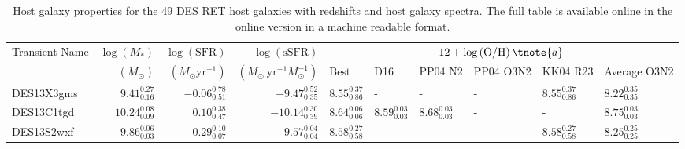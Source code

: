 \documentclass[fleqn,usenatbib,]{mnras}
\begin{document}
\begin{table}

\caption{Host galaxy properties for the 49 DES RET host galaxies with redshifts and host galaxy spectra. The full table is available online in the online version in a machine readable format.}
\begin{threeparttable}
\begin{tabular}{lrrrllllll}
\toprule
Transient Name &$\log \left(M_*\right)$ &$\log \left(\mathrm{SFR}\right)$ &  $\log \left(\mathrm{sSFR}\right)$ &                                                           \multicolumn{6}{c}{$12+\log\left(\mathrm{O/H}\right)\tnote{a} $}\\
{} & $\left( M_{\odot}\right)$ & $\left(M_{\odot} \mathrm{yr}^{-1}\right)$&$\left(M_{\odot}\ \mathrm{yr}^{-1} M_{\odot}^{-1}\right)$& Best &                                                           D16 &                                                       PP04 N2 &                                                     PP04 O3N2 &                                                      KK04 R23 &                                                   Average O3N2\tnote{b}\\
\midrule
DES13X3gms &   $9.41 _{\scriptscriptstyle 0.16} ^{\scriptscriptstyle 0.27}$ &  $-0.06 _{\scriptscriptstyle 0.51} ^{\scriptscriptstyle 0.78}$ &   $-9.47 _{\scriptscriptstyle 0.35} ^{\scriptscriptstyle 0.52}$ &  $8.55 _{\scriptscriptstyle 0.86} ^{\scriptscriptstyle 0.37}$ &                                                             - &                                                             - &                                                             - &  $8.55 _{\scriptscriptstyle 0.86} ^{\scriptscriptstyle 0.37}$ &   $8.22 _{\scriptscriptstyle 0.35} ^{\scriptscriptstyle 0.35}$ \\
DES13C1tgd &  $10.24 _{\scriptscriptstyle 0.09} ^{\scriptscriptstyle 0.08}$ &   $0.10 _{\scriptscriptstyle 0.47} ^{\scriptscriptstyle 0.38}$ &  $-10.14 _{\scriptscriptstyle 0.39} ^{\scriptscriptstyle 0.30}$ &  $8.64 _{\scriptscriptstyle 0.06} ^{\scriptscriptstyle 0.06}$ &  $8.59 _{\scriptscriptstyle 0.03} ^{\scriptscriptstyle 0.03}$ &  $8.68 _{\scriptscriptstyle 0.03} ^{\scriptscriptstyle 0.03}$ &                                                             - &                                                             - &   $8.75 _{\scriptscriptstyle 0.03} ^{\scriptscriptstyle 0.03}$ \\
DES13S2wxf &   $9.86 _{\scriptscriptstyle 0.03} ^{\scriptscriptstyle 0.06}$ &   $0.29 _{\scriptscriptstyle 0.07} ^{\scriptscriptstyle 0.10}$ &   $-9.57 _{\scriptscriptstyle 0.04} ^{\scriptscriptstyle 0.04}$ &  $8.58 _{\scriptscriptstyle 0.58} ^{\scriptscriptstyle 0.27}$ &                                                             - &                                                             - &                                                             - &  $8.58 _{\scriptscriptstyle 0.58} ^{\scriptscriptstyle 0.27}$ &   $8.25 _{\scriptscriptstyle 0.25} ^{\scriptscriptstyle 0.25}$ \\

\end{tabular}
\end{threeparttable}
\end{table}
\end{document}
